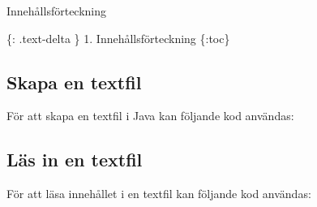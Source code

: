 Innehållsförteckning

\{: .text-delta \} 1. Innehållsförteckning \{:toc\}

\hypertarget{skapa-en-textfil}{%
\subsection{Skapa en textfil}\label{skapa-en-textfil}}

För att skapa en textfil i Java kan följande kod användas:

\hypertarget{cb1}{}
\begin{Shaded}
\begin{Highlighting}[]
\OperatorTok{=} \OperatorTok{;}
\OperatorTok{=} \OperatorTok{;}

 \OperatorTok{\{}
    \OperatorTok{=}  \OperatorTok{(}\OperatorTok{);}
    \OperatorTok{=}  \OperatorTok{(}\OperatorTok{);}
\OperatorTok{(}\OperatorTok{);}
\OperatorTok{();}
    \OperatorTok{(}\OperatorTok{);}
\OperatorTok{\}}  \OperatorTok{(}\OperatorTok{)} \OperatorTok{\{}
    \OperatorTok{(}\OperatorTok{);}
\OperatorTok{\}}
\end{Highlighting}
\end{Shaded}

\hypertarget{luxe4s-in-en-textfil}{%
\subsection{Läs in en textfil}\label{luxe4s-in-en-textfil}}

För att läsa innehållet i en textfil kan följande kod användas:


